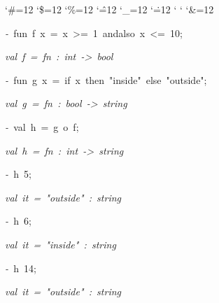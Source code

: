 \begin{list}{}
{\setlength{\leftmargin}{\leftmargini}
\setlength{\rightmargin}{0cm}
\setlength{\itemindent}{0cm}
\setlength{\listparindent}{0cm}
\setlength{\itemsep}{0cm}
\setlength{\parsep}{0cm}
\setlength{\labelsep}{0cm}
\setlength{\labelwidth}{0cm}
\catcode`\#=12
\catcode`\$=12
\catcode`\%=12
\catcode`\^=12
\catcode`\_=12
\catcode`\.=12
\catcode`
\catcode`
\catcode`\&=12
\ttfamily}
\small
\item[]\textsl{-\ }fun\ f\ x\ =\ x\ >=\ 1\ andalso\ x\ <=\ 10;
\item[]\textsl{val\ f\ =\ fn\ :\ int\ ->\ bool}
\item[]\textsl{-\ }fun\ g\ x\ =\ if\ x\ then\ "inside"\ else\ "outside";
\item[]\textsl{val\ g\ =\ fn\ :\ bool\ ->\ string}
\item[]\textsl{-\ }val\ h\ =\ g\ o\ f;
\item[]\textsl{val\ h\ =\ fn\ :\ int\ ->\ string}
\item[]\textsl{-\ }h\ 5;
\item[]\textsl{val\ it\ =\ "outside"\ :\ string}
\item[]\textsl{-\ }h\ 6;
\item[]\textsl{val\ it\ =\ "inside"\ :\ string}
\item[]\textsl{-\ }h\ 14;
\item[]\textsl{val\ it\ =\ "outside"\ :\ string}
\end{list}
